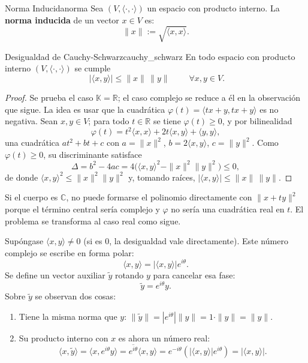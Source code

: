 \documentclass[11pt, a4paper]{article}
\begin{document}
\begin{definicion}{Norma Inducida}{norma}
Sea $(V,\langle\cdot,\cdot\rangle)$ un espacio con producto interno. La \textbf{norma inducida} de un vector $x \in V$ es:
\[
\|x\| := \sqrt{\langle x,x\rangle}.
\]
\end{definicion}

\begin{proposicion}{Desigualdad de Cauchy-Schwarz}{cauchy_schwarz}
En todo espacio con producto interno $(V,\langle\cdot,\cdot\rangle)$ se cumple
\[
\;|\langle x,y\rangle| \le \|x\|\,\|y\|\; \qquad\forall x,y\in V.
\]
\end{proposicion}

\begin{proof}
Se prueba el caso $\mathbb{K} = \mathbb{R}$; el caso complejo se reduce a él en la observación
que sigue. La idea es usar que la cuadrática $\varphi(t) = \langle tx+y, tx+y\rangle$ es no negativa. Sean
$x, y \in V$; para todo $t \in \mathbb{R}$ se tiene $\varphi(t) \ge 0$, y por bilinealidad
\[
\varphi(t) = t^2\langle x,x\rangle + 2t\langle x,y\rangle + \langle y,y\rangle,
\]
una cuadrática $a t^2 + b t + c$ con $a = \|x\|^2$, $b = 2\langle x,y\rangle$, $c = \|y\|^2$. Como
$\varphi(t)\ge 0$, su discriminante satisface
\[
\Delta = b^2 - 4ac = 4\Big(\langle x,y\rangle^2 - \|x\|^2\|y\|^2\Big) \le 0,
\]
de donde $\langle x,y\rangle^2 \le \|x\|^2\|y\|^2$ y, tomando raíces, $|\langle x,y\rangle| \le \|x\|\,\|y\|$.
\end{proof}

\obs
Si el cuerpo es $\mathbb{C}$, no puede formarse el polinomio directamente con $\|x+ty\|^2$ porque el término central sería complejo y $\varphi$ no sería una cuadrática real en $t$. El problema se transforma al caso real como sigue.

Supóngase $\langle x, y \rangle \neq 0$ (si es $0$, la desigualdad vale directamente). Este número complejo se escribe en forma polar:
\[
\langle x, y \rangle = |\langle x, y \rangle| e^{i\theta}.
\]
Se define un vector auxiliar $\tilde{y}$ rotando $y$ para cancelar esa fase:
\[
\tilde{y} = e^{i\theta} y.
\]
Sobre $\tilde{y}$ se observan dos cosas:
\begin{enumerate}
    \item Tiene la misma norma que $y$: $\|\tilde{y}\| = |e^{i\theta}| \|y\| = 1 \cdot \|y\| = \|y\|$.
    \item Su producto interno con $x$ es ahora un número real:
    \[
    \langle x, \tilde{y} \rangle = \langle x, e^{i\theta} y \rangle = \overline{e^{i\theta}} \langle x, y \rangle = e^{-i\theta} \left( |\langle x, y \rangle| e^{i\theta} \right) = |\langle x, y \rangle|.
    \]
\end{enumerate}
\end{document}
